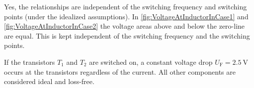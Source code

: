 
\begin{solutionblock}
	Yes, the relationships are independent of the switching frequency and switching points (under the idealized assumptions).
	In \autoref{fig:VoltageAtInductorInCase1} and \autoref{fig:VoltageAtInductorInCase2} the voltage areas above and below the zero-line are equal.
	This is kept independent of the switching frequency and the switching points.
\end{solutionblock}

\vspace{2em}\par
If the transistors $T_1$ and $T_2$ are switched on, a constant voltage drop $U_\mathrm{F}=\SI{2.5}{\volt}$ occurs at the transistors
regardless of the current. All other components are considered ideal and loss-free.

